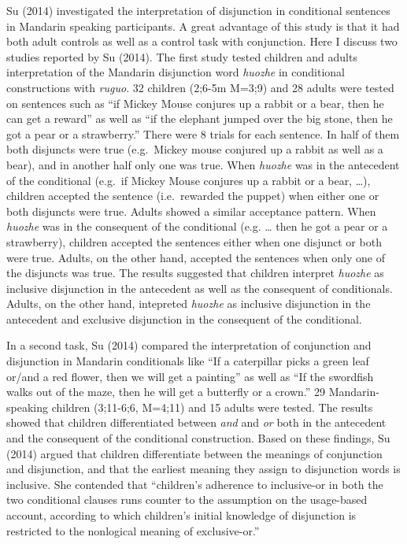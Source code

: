\documentclass[oneside]{report}
\theoremstyle{definition}
\theoremstyle{definition}
\theoremstyle{definition}
\theoremstyle{remark}
\begin{document}
Su (2014) investigated the interpretation of disjunction in conditional
sentences in Mandarin speaking participants. A great advantage of this
study is that it had both adult controls as well as a control task with
conjunction. Here I discuss two studies reported by Su (2014). The first
study tested children and adults interpretation of the Mandarin
disjunction word \emph{huozhe} in conditional constructions with
\emph{ruguo}. 32 children (2;6-5m M=3;9) and 28 adults were tested on
sentences such as ``if Mickey Mouse conjures up a rabbit or a bear, then
he can get a reward'' as well as ``if the elephant jumped over the big
stone, then he got a pear or a strawberry.'' There were 8 trials for
each sentence. In half of them both disjuncts were true (e.g.~Mickey
mouse conjured up a rabbit as well as a bear), and in another half only
one was true. When \emph{huozhe} was in the antecedent of the
conditional (e.g.~if Mickey Mouse conjures up a rabbit or a bear,
\ldots{}), children accepted the sentence (i.e.~rewarded the puppet)
when either one or both disjuncts were true. Adults showed a similar
acceptance pattern. When \emph{huozhe} was in the consequent of the
conditional (e.g. \ldots{} then he got a pear or a strawberry), children
accepted the sentences either when one disjunct or both were true.
Adults, on the other hand, accepted the sentences when only one of the
disjuncts was true. The results suggested that children interpret
\emph{huozhe} as inclusive disjunction in the antecedent as well as the
consequent of conditionals. Adults, on the other hand, intepreted
\emph{huozhe} as inclusive disjunction in the antecedent and exclusive
disjunction in the consequent of the conditional.

In a second task, Su (2014) compared the interpretation of conjunction
and disjunction in Mandarin conditionals like ``If a caterpillar picks a
green leaf or/and a red flower, then we will get a painting'' as well as
``If the swordfish walks out of the maze, then he will get a butterfly
or a crown.'' 29 Mandarin-speaking children (3;11-6;6, M=4;11) and 15
adults were tested. The results showed that children differentiated
between \emph{and} and \emph{or} both in the antecedent and the
consequent of the conditional construction. Based on these findings, Su
(2014) argued that children differentiate between the meanings of
conjunction and disjunction, and that the earliest meaning they assign
to disjunction words is inclusive. She contended that ``children's
adherence to inclusive-or in both the two conditional clauses runs
counter to the assumption on the usage-based account, according to which
children's initial knowledge of disjunction is restricted to the
nonlogical meaning of exclusive-or.''
\end{document}
